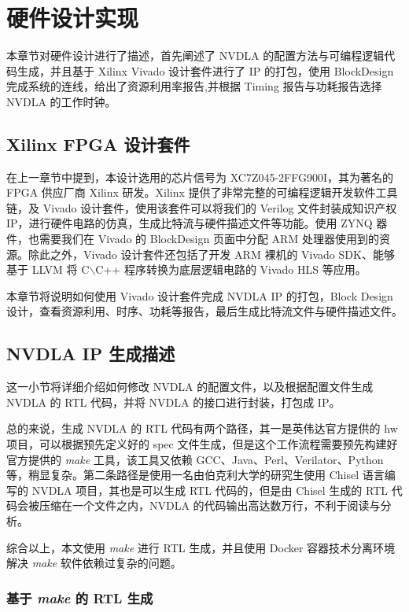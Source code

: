 \chapter{硬件设计实现}\label{chap:hardware}

本章节对硬件设计进行了描述，首先阐述了 NVDLA 的配置方法与可编程逻辑代码生成，并且基于 Xilinx Vivado 设计套件进行了 IP 的打包，使用 BlockDesign 完成系统的连线，给出了资源利用率报告,并根据 Timing 报告与功耗报告选择 NVDLA 的工作时钟。  

\section{Xilinx FPGA 设计套件}

在上一章节中提到，本设计选用的芯片信号为 XC7Z045-2FFG900I，其为著名的 FPGA 供应厂商 Xilinx 研发。Xilinx 提供了非常完整的可编程逻辑开发软件工具链，及 Vivado 设计套件，使用该套件可以将我们的 Verilog 文件封装成知识产权 IP，进行硬件电路的仿真，生成比特流与硬件描述文件等功能。使用 ZYNQ 器件，也需要我们在 Vivado 的 BlockDesign 页面中分配 ARM 处理器使用到的资源。除此之外，Vivado 设计套件还包括了开发 ARM 裸机的 Vivado SDK、能够基于 LLVM 将 C$\backslash$C++ 程序转换为底层逻辑电路的 Vivado HLS 等应用。

本章节将说明如何使用 Vivado 设计套件完成 NVDLA IP 的打包，Block Design 设计，查看资源利用、时序、功耗等报告，最后生成比特流文件与硬件描述文件。 

\section{NVDLA IP 生成描述}

这一小节将详细介绍如何修改 NVDLA 的配置文件，以及根据配置文件生成 NVDLA 的 RTL 代码，并将 NVDLA 的接口进行封装，打包成 IP。

总的来说，生成 NVDLA 的 RTL 代码有两个路径，其一是英伟达官方提供的 hw 项目，可以根据预先定义好的 spec 文件生成，但是这个工作流程需要预先构建好官方提供的 \emph{make} 工具，该工具又依赖 GCC、Java、Perl、Verilator、Python 等，稍显复杂。第二条路径是使用一名由伯克利大学的研究生使用 Chisel 语言编写的 NVDLA 项目，其也是可以生成 RTL 代码的，但是由 Chisel 生成的 RTL 代码会被压缩在一个文件之内，NVDLA 的代码输出高达数万行，不利于阅读与分析。

综合以上，本文使用 \emph{make} 进行 RTL 生成，并且使用 Docker 容器技术分离环境解决 \emph{make} 软件依赖过复杂的问题。

\subsection{基于 \emph{make} 的 RTL 生成}

